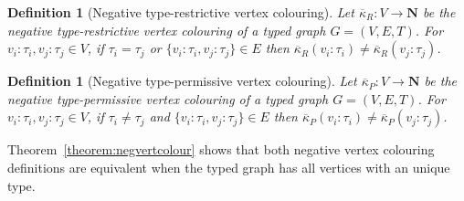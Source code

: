 \documentclass[preprint,12pt]{elsarticle}
\theoremstyle{plain}
\newtheorem{definition}[theorem]{Definition}
\newcommand\tyv[2]{#1\!\!:\!\!#2}
\begin{document}
\begin{definition}[Negative type-restrictive vertex colouring]
Let $\overline{\kappa}_R:V\rightarrow \mathbf{N}$ be the
negative type-restrictive vertex colouring of a typed graph $G = (V,E,T)$.
For $\tyv{v_i}{\tau_i}, \tyv{v_j}{\tau_j}\in V$,
if $\tau_i=\tau_j$
or
$\{\tyv{v_i}{\tau_i}, \tyv{v_j}{\tau_j}\}\in E$
then
$\overline{\kappa}_R(\tyv{v_i}{\tau_i})\neq\overline{\kappa}_R(\tyv{v_j}{\tau_j})$.
\end{definition}

\begin{definition}[Negative type-permissive vertex colouring]
Let $\overline{\kappa}_P:V\rightarrow \mathbf{N}$ be the
negative type-permissive vertex colouring of a typed graph $G = (V,E,T)$.
For $\tyv{v_i}{\tau_i}, \tyv{v_j}{\tau_j}\in V$,
if $\tau_i\neq\tau_j$
and
$\{\tyv{v_i}{\tau_i}, \tyv{v_j}{\tau_j}\}\in E$
then
$\overline{\kappa}_P(\tyv{v_i}{\tau_i})\neq\overline{\kappa}_P(\tyv{v_j}{\tau_j})$.
\end{definition}

Theorem~\ref{theorem:negvertcolour} shows that both negative vertex colouring definitions
are equivalent when the typed graph has all vertices with an unique type.
\end{document}
